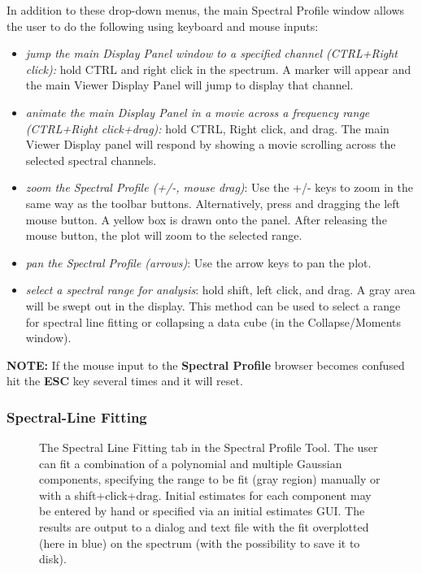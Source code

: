In addition to these drop-down menus, the main Spectral Profile window allows the user to do the following using keyboard and mouse inputs: %

\begin{itemize}
\item {\em jump the main Display Panel window to a specified channel (CTRL+Right click):} hold CTRL and right click in the spectrum. A marker will appear and the
main Viewer Display Panel will jump to display that channel.
\item {\em animate the main Display Panel in a movie across a frequency range (CTRL+Right click+drag):} hold CTRL, Right click, and drag. The main Viewer Display
panel will respond by showing a movie scrolling across the selected spectral channels.
\item {\em zoom the Spectral Profile (+/-, mouse drag)}: Use the +/- keys to zoom in the same
way as the toolbar buttons. Alternatively, press and dragging the left mouse button. A yellow box is drawn onto the panel. After releasing the mouse button,
the plot will zoom to the selected range.
\item {\em pan the Spectral Profile (arrows)}: Use the arrow keys to pan the plot.
\item {\em select a spectral range for analysis}: hold shift, left click, and drag. A gray area will be swept out in the display. This method can be used to select a range
for spectral line fitting or collapsing a data cube (in the Collapse/Moments window).
\end{itemize}

{\bf NOTE:} If the mouse input to the {\bf Spectral Profile} browser becomes confused hit the {\bf ESC} key several times and it will reset.

\subsubsection{Spectral-Line Fitting}
\label{section:display.image.specprof.specfit}

\begin{figure}[h!]
\begin{center}
\caption{\label{fig:viewer_specproffit} The Spectral Line Fitting tab in the 
Spectral Profile Tool. The user can fit a combination of a polynomial and multiple Gaussian components,
specifying the range to be fit (gray region) manually or with a shift+click+drag. Initial estimates for each component
may be entered by hand or specified via an initial estimates GUI. The results are output to a dialog and text file with
the fit overplotted (here in blue) on the spectrum (with the possibility to save it to disk).}
\end{center}
\end{figure}

